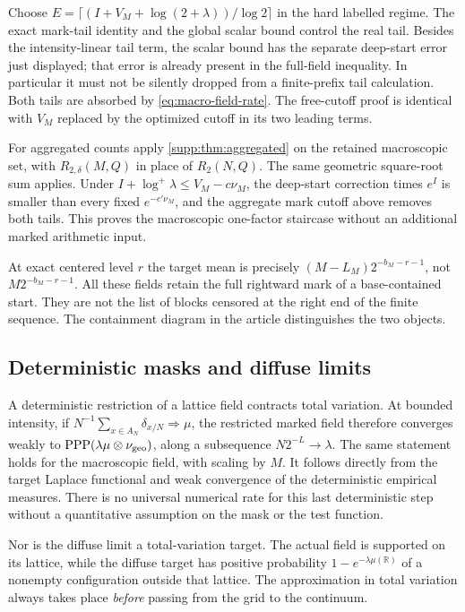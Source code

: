 Choose $E=\lceil(I+V_M+\log(2+\lambda))/\log2\rceil$ in the hard
labelled regime. The exact mark-tail identity and the global scalar
bound control the real tail. Besides the intensity-linear tail term,
the scalar bound has the separate deep-start error just displayed;
that error is already present in the full-field inequality. In
particular it must not be silently dropped from a finite-prefix tail
calculation. Both tails are absorbed by
\eqref{eq:macro-field-rate}. The free-cutoff proof is identical with
$V_M$ replaced by the optimized cutoff in its two leading terms.

For aggregated counts apply \cref{supp:thm:aggregated} on the retained
macroscopic set, with $R_{2,\delta}(M,Q)$ in place of $R_2(N,Q)$.
The same geometric square-root sum applies. Under
$I+\log^+\lambda\le V_M-c\nu_M$, the deep-start correction times
$e^I$ is smaller than every fixed $e^{-c'\nu_M}$, and the aggregate
mark cutoff above removes both tails. This proves the macroscopic
one-factor staircase without an additional marked arithmetic input.

At exact centered level $r$ the target mean is precisely
$(M-L_M)2^{-b_M-r-1}$, not $M2^{-b_M-r-1}$.
All these fields retain the full rightward mark of a base-contained
start. They are not the list of blocks censored at the right end of the
finite sequence. The containment diagram in the article distinguishes
the two objects.

\subsection{Deterministic masks and diffuse limits}
A deterministic restriction of a lattice field contracts total
variation. At bounded intensity, if
$N^{-1}\sum_{x\in A_N}\delta_{x/N}\Rightarrow\mu$, the restricted marked
field therefore converges weakly to
$\operatorname{PPP}(\lambda\mu\otimes\nu_{\rm geo})$, along a subsequence
$N2^{-L}\to\lambda$. The same statement holds for the macroscopic field,
with scaling by $M$. It follows directly from the target Laplace
functional and weak convergence of the deterministic empirical measures.
There is no universal numerical rate for this last deterministic step
without a quantitative assumption on the mask or the test function.

Nor is the diffuse limit a total-variation target. The actual field is
supported on its lattice, while the diffuse target has positive
probability $1-e^{-\lambda\mu(\mathbb R)}$ of a nonempty configuration
outside that lattice. The approximation in total variation always takes
place \emph{before} passing from the grid to the continuum.
